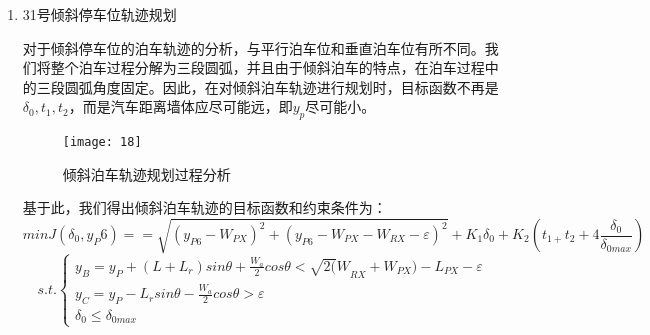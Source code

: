 \documentclass{MathorCupmodeling}
\begin{document}
\begin{enumerate}
\begin{enumerate}
	\item 31号倾斜停车位轨迹规划

	对于倾斜停车位的泊车轨迹的分析，与平行泊车位和垂直泊车位有所不同。我们将整个泊车过程分解为三段圆弧，并且由于倾斜泊车的特点，在泊车过程中的三段圆弧角度固定。因此，在对倾斜泊车轨迹进行规划时，目标函数不再是$\delta_0,t_1,t_2$，而是汽车距离墙体应尽可能远，即$y_p$尽可能小。
	
	\begin{figure}[H]
		\centering
		\texttt{[image: 18]}
		\caption{倾斜泊车轨迹规划过程分析}
		\label{fig:circuit-diagram}
	\end{figure}
	基于此，我们得出倾斜泊车轨迹的目标函数和约束条件为：
	\begin{equation}	
minJ(\delta_0,y_P6)==\sqrt{{(y_{P6}-W_{PX})}^2+{(y_{P6}-W_{PX}-W_{RX}-\varepsilon)}^2}+K_1\delta_0+K_2(t_{1+}t_2+4\frac{\delta_0}{\delta_{0max}})
	\end{equation}
	\begin{equation}
s.t.\left\{\begin{matrix}
	 y_B=y_P+\left(L+L_r\right)sin\theta+\frac{W_a}{2}cos\theta<{\sqrt{2(}W}_{RX}+W_{PX})-L_{PX}-\varepsilon
	\\ y_C=y_P-L_rsin\theta-\frac{W_a}{2}cos\theta>\varepsilon
	\\\delta_0\le\delta_{0max}	
\end{matrix}\right.
	\end{equation}
\end{enumerate}

\end{enumerate}
\end{document}
